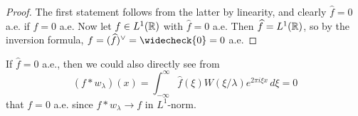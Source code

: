 \begin{proof}
  The first statement follows from the latter
  by linearity, and
  clearly $\widehat{f} = 0$ a.e. if $f = 0$ a.e.
  Now let $f \in L^1(\mathbb{R})$ with
  $\widehat{f} = 0$ a.e. Then $\widehat{f} = L^1(\mathbb{R})$,
  so by the inversion formula,
  $f = (\widehat{f})^\vee = \widecheck{0} = 0$ a.e.
\end{proof}

\begin{remark}
  If $\widehat{f} = 0$ a.e., then we could also directly
  see from
  \[
    (f * w_\lambda)(x)
    = \int_{-\infty}^\infty \widehat{f}(\xi) W(\xi / \lambda) e^{2\pi i \xi x}\, d\xi
    = 0
  \]
  that $f = 0$ a.e. since $f * w_\lambda \to f$
  in $L^1$-norm.
\end{remark}
